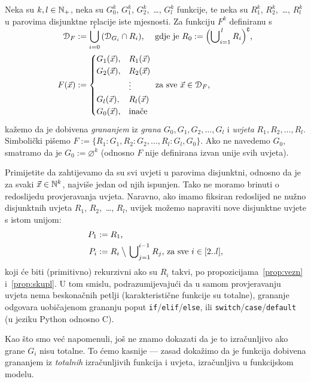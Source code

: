 \begin{definicija}\label{def:gr}
Neka su $k,l\in{\mathbb N}_+$, neka su $G_0^k$, $G_1^k$, $G_2^k$,~\ldots, $G_l^k$ funkcije, te neka su $R_1^k$, $R_2^k$,~\ldots, $R_l^k$ u parovima disjunktne relacije iste mjesnosti. Za funkciju $F^k$ definiranu s
\begin{align}
\SwapAboveDisplaySkip
    \dom{F}&:=\bigcup_{i=0}^l\,(\dom{G_i}\cap R_i)\text{, \quad gdje je }
    R_0:=\Bigl(\bigcup\nolimits_{i=1}^{\,l}R_i\Bigr)\kompl\text,\\
    F(\vec x)&:=\begin{cases}
    G_1(\vec x),&R_1(\vec x)\\
    G_2(\vec x),&R_2(\vec x)\\
    &\vdots\\
    G_l(\vec x),&R_l(\vec x)\\
    G_0(\vec x),&\text{inače}
    \end{cases}\text{ za sve $\vec x\in\dom F$,}
\end{align}
kažemo da je dobivena \emph{grananjem} iz \emph{grana} $G_0,G_1,G_2,\dotsc,G_l$ i \emph{uvjeta} $R_1,R_2,\dotsc,R_l$. Simbolički pišemo $F:=\{R_1\colon G_1,R_2\colon G_2,\dotsc,R_l\colon G_l,G_0\}$. Ako ne navedemo $G_0$, smatramo da je $G_0:=\varnothing^k$ (odnosno $F$ nije definirana izvan unije svih uvjeta).
\end{definicija}

Primijetite da zahtijevamo da su svi uvjeti u parovima disjunktni, odnosno da je za svaki $\vec x\in{\mathbb N}^k$, najviše jedan od njih ispunjen. Tako ne moramo brinuti o redoslijedu provjeravanja uvjeta. Naravno, ako imamo fiksiran redoslijed ne nužno disjunktnih uvjeta $R_1$, $R_2$,~\ldots, $R_l$, uvijek možemo napraviti nove disjunktne uvjete s istom unijom:
\begin{align}
    P_1&:=R_1\text,\\
    P_i&:=R_i\mathbin{\big\backslash}\,\bigcup\nolimits_{j=1}^{i-1}R_j\text{, za sve $i\in[2..l]$,}
\end{align}
koji će biti (primitivno) rekurzivni ako su $R_i$ takvi, po propozicijama~\ref{prop:vezn} i~\ref{prop:skupl}. U tom smislu, podrazumijevajući da u samom provjeravanju uvjeta nema beskonačnih petlji (karakteristične funkcije su totalne), grananje odgovara uobičajenom grananju poput \texttt{if}/\texttt{elif}/\texttt{else}, ili \texttt{switch}/\texttt{case}/\texttt{default} (u jeziku Python odnosno C).

Kao što smo već napomenuli, još ne znamo dokazati da je to izračunljivo ako grane $G_i$ nisu totalne. To ćemo kasnije --- zasad dokažimo da je funkcija dobivena grananjem iz \emph{totalnih} izračunljivih funkcija i uvjeta, izračunljiva u funkcijskom modelu.

